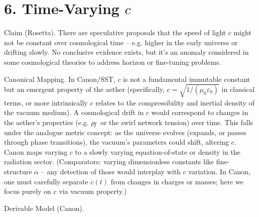 \documentclass[11pt]{article}
\begin{document}
\section*{6. Time-Varying $c$}

Claim (Rosetta). There are speculative proposals that the speed of light $c$ might not be constant over cosmological time – e.g. higher in the early universe or drifting slowly. No conclusive evidence exists, but it’s an anomaly considered in some cosmological theories to address horizon or fine-tuning problems.


Canonical Mapping. In Canon/SST, $c$ is not a fundamental immutable constant but an emergent property of the aether (specifically, $c = \sqrt{1/(\mu_0 \varepsilon_0)}$ in classical terms, or more intrinsically $c$ relates to the compressibility and inertial density of the vacuum medium). A cosmological drift in $c$ would correspond to changes in the aether’s properties (e.g. $\rho_{\!f}$ or the swirl network tension) over time. This falls under the analogue metric concept: as the universe evolves (expands, or passes through phase transitions), the vacuum’s parameters could shift, altering $c$. Canon maps varying $c$ to a slowly varying equation-of-state or density in the radiation sector. (Comparators: varying dimensionless constants like fine-structure $\alpha$ – any detection of those would interplay with $c$ variation. In Canon, one must carefully separate $c(t)$ from changes in charges or masses; here we focus purely on $c$ via vacuum property.)


Derivable Model (Canon).
\end{document}
